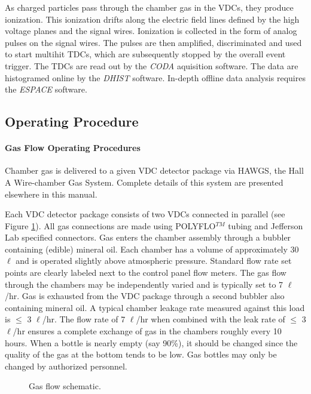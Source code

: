 \documentclass[12pt]{article}
\begin{document}
As charged particles pass through the chamber gas in the VDCs, they
produce ionization.  This ionization drifts along the electric field
lines defined by the high voltage planes and the signal wires.  
Ionization is collected in the form of analog pulses on the signal
wires.  The pulses are then amplified, discriminated and used to
start multihit TDCs, which are subsequently stopped by the overall
event trigger.  The TDCs are read out by the {\it CODA} aquisition
software.  The data are histogramed online by the {\it DHIST}
software.  In-depth offline data analysis requires the {\it ESPACE}
software.

\subsection{Operating Procedure}
\paragraph {Gas Flow Operating Procedures}

Chamber gas is delivered to a given VDC detector package via HAWGS,
the Hall A Wire-chamber Gas System.  Complete details of this system
are presented elsewhere in this manual.

Each VDC detector package consists of two VDCs connected in parallel
(see Figure \ref{gasflow}).  All gas connections are made using
POLYFLO$^{TM}$ tubing and Jefferson Lab specified connectors.  Gas enters the
chamber assembly through a bubbler containing (edible) mineral oil.
Each chamber has a volume of approximately 30 $\ell$ and is operated
slightly above atmospheric pressure.  Standard flow rate set points
are clearly labeled next to the control panel flow meters.  The gas
flow through the chambers may be independently varied and is typically
set to 7 $\ell$/hr.  Gas is exhausted from the VDC package through a
second bubbler also containing mineral oil.  A typical chamber leakage
rate measured against this load is $\le$ 3 $\ell$/hr.  The flow rate of
7 $\ell$/hr when combined with the leak rate of $\le$ 3 $\ell$/hr
ensures a complete exchange of gas in the chambers roughly every
10 hours.
When a
bottle is nearly empty (say 90\%), it should be changed since the
quality of the gas at the bottom tends to be low.  Gas bottles may
only be changed by authorized personnel.

\begin{figure}[H]
\setlength{\epsfxsize}{1.00\textwidth}
\setlength{\epsfysize}{0.825\textwidth}
\leavevmode
{}
\caption{Gas flow schematic.}
\label{gasflow}
\end{figure}
\end{document}
